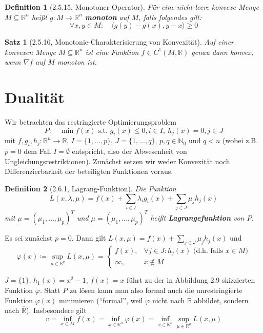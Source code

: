\documentclass[12pt]{extreport} %
\newcommand{\N}{\mathbb{N}}
\newcommand{\R}{\mathbb{R}}
\theoremstyle{named}
\theoremstyle{nnamed}
\theoremstyle{itshape}
\newtheorem*{satz}{Satz}
\newtheorem*{definition}{Definition}
\theoremstyle{normal}
\begin{document}
\begin{definition}[2.5.15, Monotoner Operator]
	Für eine nicht-leere konvexe Menge $M \subseteq \R^n$ heißt $g \colon M \rightarrow \R^n$ \textbf{monoton} auf $M$, falls folgendes gilt:
	$$ \forall x,y \in M: \quad \langle g(y) - g(x), y - x \rangle \geq 0 $$
\end{definition}

\begin{satz}[2.5.16, Monotonie-Charakterisierung von Konvexität]
	Auf einer konvexen Menge $M \subseteq \R^n$ ist eine Funktion $f \in C^1(M, \R)$ genau dann konvex, wenn $\nabla f$ auf $M$ monoton ist.	
\end{satz}

\newpage

\section{Dualität}

Wir betrachten das restringierte Optimierungsproblem 
	$$ P: \quad \min f(x) \text{ s.t. } g_i(x) \leq 0, i \in I, ~h_j(x) = 0, j \in J $$
mit $f, g_i, h_j \colon \R^n \rightarrow \R$, $I = \{ 1, \dotsc, p \}$, $J = \{ 1, \dotsc, q \}$, $p, q \in \N_0$ und $q < n$ (wobei z.B. $p = 0$ dem Fall $I = \emptyset$ entspricht, also der Abwesenheit von Ungleichungsrestriktionen). Zunächst setzen wir weder Konvexität noch Differenzierbarkeit der beteiligten Funktionen voraus.

\begin{definition}[2.6.1, Lagrang-Funktion]
	Die Funktion 
	$$ L(x, \lambda, \mu) = f(x) + \sum_{i \in I} \lambda_i g_i(x) + \sum_{j \in J} \mu_j h_j(x) $$
	mit $\mu = (\mu_1, \dotsc, \mu_p)^T$ und $\mu = ( \mu_1, \dotsc, \mu_p)^T$ heißt \textbf{Lagrangefunktion} von $P$. 
\end{definition}

Es sei zunächst $p = 0$. Dann gilt $L(x, \mu) = f(x) + \sum_{j \in J} \mu_j h_j(x)$ und 
	$$ \varphi(x) \coloneqq \sup_{\mu \in \R^q} L(x, \mu) = \begin{cases} f(x), & \forall j \in J: h_j(x) \text{ (d.h. falls } x \in M) \\ \infty, & x \notin M \end{cases} $$

\begin{beispiel}
	$J = \{ 1 \}$, $h_1(x) = x^2 - 1$, $f(x) = x$ führt zu der in Abbildung 2.9 skizzierten Funktion $\varphi$. Statt $P$ zu lösen kann man also formal auch die unrestringierte Funktion $\varphi(x)$ minimieren (\enquote{formal}, weil $\varphi$ nicht nach $\R$ abbildet, sondern nach $\overline{\R}$). Insbesondere gilt
	$$ v = \inf_{x \in M} f(x) = \inf_{x \in \R^n} \varphi(x) = \inf_{x \in \R^n} \sup_{\mu \in \R^q} L(x, \mu) $$	
\end{beispiel}
\end{document}
